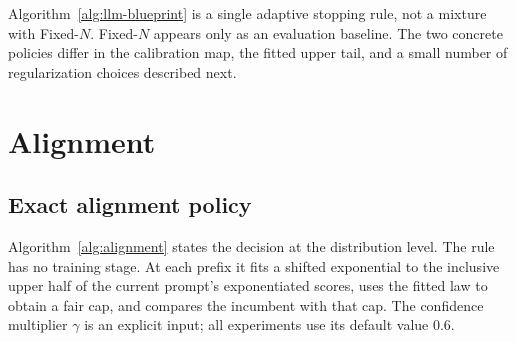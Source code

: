Algorithm~\ref{alg:llm-blueprint} is a single adaptive stopping rule, not a
mixture with Fixed-$N$.  Fixed-$N$ appears only as an evaluation baseline.
The two concrete policies differ in the calibration map, the fitted upper
tail, and a small number of regularization choices described next.


\section{Alignment}
\label{sec:alignment}

\subsection{Exact alignment policy}
\label{sec:alignment-algorithm}

Algorithm~\ref{alg:alignment} states the decision at the distribution level.
The rule has no training stage.  At each prefix it fits a shifted exponential
to the inclusive upper half of the current prompt's exponentiated scores,
uses the fitted law to obtain a fair cap, and compares the incumbent with that
cap.  The confidence multiplier $\gamma$ is an explicit input; all experiments
use its default value $0.6$.


